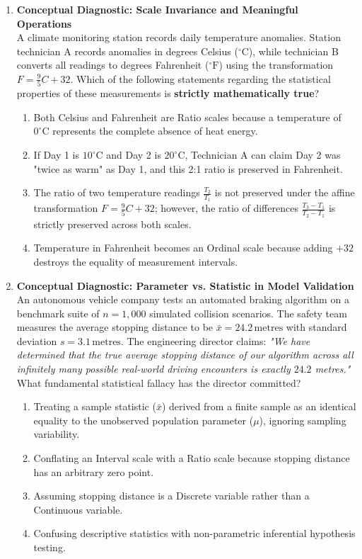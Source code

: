 \begin{enumerate}[resume]
\item \textbf{Conceptual Diagnostic: Scale Invariance and Meaningful Operations} \\
A climate monitoring station records daily temperature anomalies. Station technician A records anomalies in degrees Celsius ($^\circ\text{C}$), while technician B converts all readings to degrees Fahrenheit ($^\circ\text{F}$) using the transformation $F = \frac{9}{5}C + 32$. Which of the following statements regarding the statistical properties of these measurements is \textbf{strictly mathematically true}?
\begin{enumerate}
    \item Both Celsius and Fahrenheit are Ratio scales because a temperature of $0^\circ\text{C}$ represents the complete absence of heat energy.
    \item If Day 1 is $10^\circ\text{C}$ and Day 2 is $20^\circ\text{C}$, Technician A can claim Day 2 was "twice as warm" as Day 1, and this 2:1 ratio is preserved in Fahrenheit.
    \item The ratio of two temperature readings $\frac{T_2}{T_1}$ is not preserved under the affine transformation $F = \frac{9}{5}C + 32$; however, the ratio of differences $\frac{T_3 - T_1}{T_2 - T_1}$ is strictly preserved across both scales.
    \item Temperature in Fahrenheit becomes an Ordinal scale because adding $+32$ destroys the equality of measurement intervals.
\end{enumerate}

\item \textbf{Conceptual Diagnostic: Parameter vs. Statistic in Model Validation} \\
An autonomous vehicle company tests an automated braking algorithm on a benchmark suite of $n = 1{,}000$ simulated collision scenarios. The safety team measures the average stopping distance to be $\bar{x} = 24.2\,\text{metres}$ with standard deviation $s = 3.1\,\text{metres}$. The engineering director claims: \textit{"We have determined that the true average stopping distance of our algorithm across all infinitely many possible real-world driving encounters is exactly $24.2$ metres."} What fundamental statistical fallacy has the director committed?
\begin{enumerate}
    \item Treating a sample statistic ($\bar{x}$) derived from a finite sample as an identical equality to the unobserved population parameter ($\mu$), ignoring sampling variability.
    \item Conflating an Interval scale with a Ratio scale because stopping distance has an arbitrary zero point.
    \item Assuming stopping distance is a Discrete variable rather than a Continuous variable.
    \item Confusing descriptive statistics with non-parametric inferential hypothesis testing.
\end{enumerate}
\end{enumerate}
